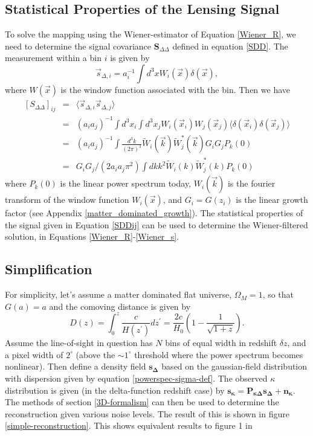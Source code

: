 \documentclass[12pt,preprint]{aastex}			%
\begin{document}
\subsection{Statistical Properties of the Lensing Signal}
To solve the mapping using the Wiener-estimator of Equation \ref{Wiener_R}, we
need to determine the signal covariance $\mathbf{S}_{\Delta\Delta}$ defined
in equation \ref{SDD}.  The measurement within a bin $i$ is given by
\begin{equation}
  \vec{s}_{\Delta,i} = a_i^{-1}\int d^3x W_i(\vec{x})\delta(\vec{x}),
\end{equation}
where $W(\vec{x})$ is the window function associated with the bin.  Then we have
\begin{equation}
  \label{SDDij}
  \begin{array}{lll}
      [S_{\Delta\Delta}]_{ij} &=& \langle \vec{s}_{\Delta,i}\vec{s}_{\Delta,j}\rangle \\
                              &=& (a_i a_j)^{-1} \int d^3x_i \int d^3x_j W_i(\vec{x}_i)W_j(\vec{x}_j) \langle \delta(\vec{x}_i)\delta(\vec{x}_j)\rangle \\
                              &=& (a_ia_j)^{-1} \int \frac{d^3k}{(2\pi)^3}\widetilde{W}_i(\vec{k})\widetilde{W}^*_j(\vec{k})G_iG_jP_k(0)\\
                              &=& G_iG_j/(2 a_ia_j \pi^2) \int dk k^2 \widetilde{W}_i(k)\widetilde{W}^*_j(k)P_k(0)
  \end{array}
\end{equation}
where $P_k(0)$ is the linear power spectrum today, $W_i(\vec{k})$ is the 
fourier transform of the window function $W_i(\vec{x})$, and $G_i = G(z_i)$ 
is the linear growth factor (see Appendix \ref{matter_dominated_growth}).  
The statistical properties of the signal given in Equation \ref{SDDij} can 
be used to determine the Wiener-filtered solution, in Equations 
\ref{Wiener_R}-\ref{Wiener_s}.


\subsection{Simplification}
For simplicity, let's assume a matter dominated flat universe, $\Omega_M = 1$,
so that $G(a) = a$ and the comoving distance is given by
\begin{equation}
  D(z) = \int_0^z \frac{c}{H(z^\prime)}dz^\prime = \frac{2c}{H_0} \left(1-\frac{1}{\sqrt{1+z}} \right).
\end{equation}
Assume the line-of-sight in question has $N$ bins of 
equal width in redshift $\delta z$, and a pixel width of $2^\circ$ (above the 
$\sim 1^\circ$ threshold where the power spectrum becomes nonlinear).  Then
define a density field $\mathbf{s_\Delta}$ based on the gaussian-field 
distribution with dispersion given by equation \ref{powerspec-sigma-def}.
The observed $\kappa$ distribution is given (in the delta-function redshift
case) by $\mathbf{s_\kappa} = \mathbf{P_{\kappa\Delta}}\mathbf{s_\Delta} 
+ \mathbf{n_\kappa}$.  The methods of section \ref{3D-formalism} can then
be used to determine the reconstruction given various noise levels.  The
result of this is shown in figure \ref{simple-reconstruction}.  This shows
equivalent results to figure 1 in \citet{Hu02}
\end{document}
